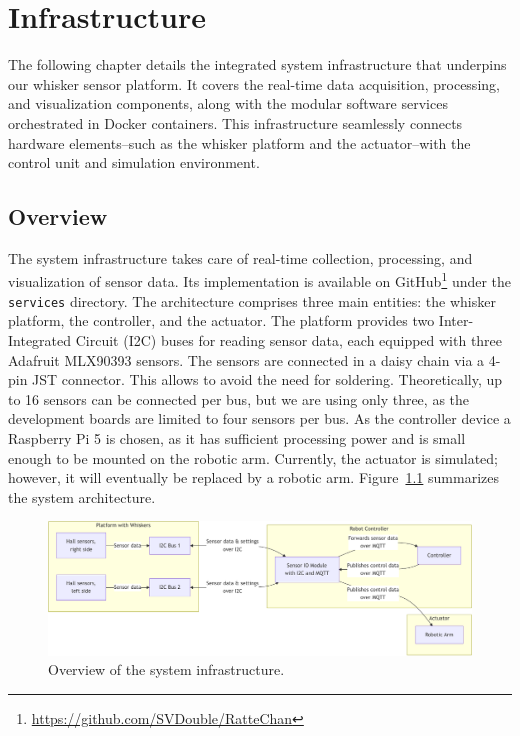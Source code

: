 

\chapter{Infrastructure}

The following chapter details the integrated system infrastructure that underpins our whisker sensor platform.
It covers the real-time data acquisition, processing, and visualization components, along with the modular software services orchestrated in Docker containers.
This infrastructure seamlessly connects hardware elements--such as the whisker platform and the actuator--with the control unit and simulation environment.


\section{Overview}
The system infrastructure takes care of real-time collection, processing, and visualization of sensor data.
Its implementation is available on GitHub\footnote{\url{https://github.com/SVDouble/RatteChan}} under the \texttt{services} directory.
The architecture comprises three main entities: the whisker platform, the controller, and the actuator.
The platform provides two Inter-Integrated Circuit (I2C) buses for reading sensor data, each equipped with three Adafruit MLX90393 sensors.
The sensors are connected in a daisy chain via a 4-pin JST connector.
This allows to avoid the need for soldering.
Theoretically, up to 16 sensors can be connected per bus, but we are using only three, as the development boards are limited to four sensors per bus.
As the controller device a Raspberry Pi 5 is chosen, as it has sufficient processing power and is small enough to be mounted on the robotic arm.
Currently, the actuator is simulated; however, it will eventually be replaced by a robotic arm.
Figure~\ref{fig:infrastructure_overview} summarizes the system architecture.

\begin{figure}[htb]
    \centering
    \includegraphics[width=\textwidth]{figures/diagrams/infrastructure-overview}
    \caption{Overview of the system infrastructure.}
    \label{fig:infrastructure_overview}
\end{figure}


